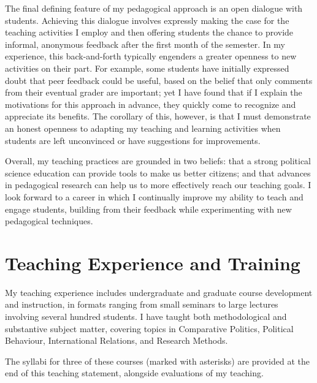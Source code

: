 \documentclass[11pt]{article}
\begin{document}
	The final defining feature of my pedagogical approach is an open dialogue with students. Achieving this dialogue involves expressly making the case for the teaching activities I employ and then offering students the chance to provide informal, anonymous feedback after the first month of the semester. In my experience, this back-and-forth typically engenders a greater openness to new activities on their part. For example, some students have initially expressed doubt that peer feedback could be useful, based on the belief that only comments from their eventual grader are important; yet I have found that if I explain the motivations for this approach in advance, they quickly come to recognize and appreciate its benefits. The corollary of this, however, is that I must demonstrate an honest openness to adapting my teaching and learning activities when students are left unconvinced or have suggestions for improvements. 

	Overall, my teaching practices are grounded in two beliefs: that a strong political science education can provide tools to make us better citizens; and that advances in pedagogical research can help us to more effectively reach our teaching goals. I look forward to a career in which I continually improve my ability to teach and engage students, building from their feedback while experimenting with new pedagogical techniques.\\[-5ex]


	\section{ Teaching Experience and Training}

	My teaching experience includes undergraduate and graduate course development and instruction, in formats ranging from small seminars to large lectures involving several hundred students. I have taught both methodological and substantive subject matter, covering topics in Comparative Politics, Political Behaviour, International Relations, and Research Methods.

	The syllabi for three of these courses (marked with asterisks) are provided at the end of this teaching statement, alongside evaluations of my teaching.\\[-5ex]
\end{document}
